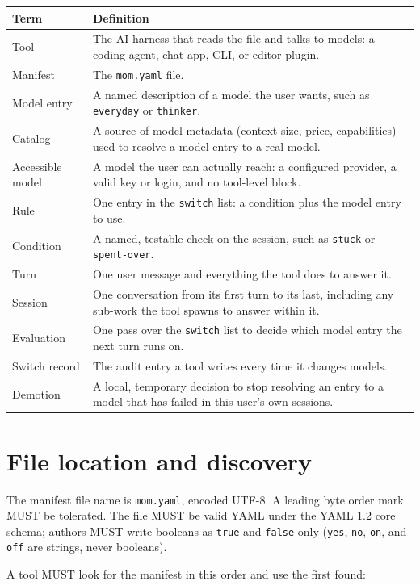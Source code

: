 \documentclass[11pt]{article}
\newcommand{\key}[1]{\texttt{#1}}
\begin{document}
\begin{tabularx}{\textwidth}{@{}lX@{}}
\toprule
Term & Definition \\
\midrule
Tool & The AI harness that reads the file and talks to models: a coding agent, chat app, CLI, or editor plugin. \\
Manifest & The \key{mom.yaml} file. \\
Model entry & A named description of a model the user wants, such as \key{everyday} or \key{thinker}. \\
Catalog & A source of model metadata (context size, price, capabilities) used to resolve a model entry to a real model. \\
Accessible model & A model the user can actually reach: a configured provider, a valid key or login, and no tool-level block. \\
Rule & One entry in the \key{switch} list: a condition plus the model entry to use. \\
Condition & A named, testable check on the session, such as \key{stuck} or \key{spent-over}. \\
Turn & One user message and everything the tool does to answer it. \\
Session & One conversation from its first turn to its last, including any sub-work the tool spawns to answer within it. \\
Evaluation & One pass over the \key{switch} list to decide which model entry the next turn runs on. \\
Switch record & The audit entry a tool writes every time it changes models. \\
Demotion & A local, temporary decision to stop resolving an entry to a model that has failed in this user's own sessions. \\
\bottomrule
\end{tabularx}

\section{File location and discovery}

The manifest file name is \key{mom.yaml}, encoded UTF-8. A leading byte
order mark MUST be tolerated. The file MUST be valid YAML under the
YAML 1.2 core schema; authors MUST write booleans as \key{true} and
\key{false} only (\key{yes}, \key{no}, \key{on}, and \key{off} are
strings, never booleans).

A tool MUST look for the manifest in this order and use the first found:
\end{document}
